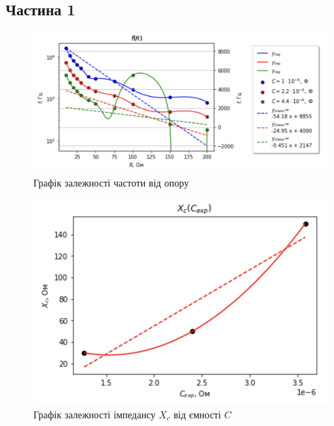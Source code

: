 \documentclass[a4paper,12pt]{article}
\begin{document}
\begin{justify}
    \subsection*{Частина 1}
    \begin{figure}[h!]
		\begin{center}
			\includegraphics[scale=0.8]{media/graph13}
		\end{center}
		\caption{Графік залежності частоти від опору}
		\label{Picture_1}
	\end{figure}
	\begin{figure}[h!]
		\begin{center}
			\includegraphics[scale=0.8]{media/graph14}
		\end{center}
		\caption{Графік залежності імпедансу $X_c$ від ємності $C$}
		\label{Picture_2}
	\end{figure}\newpage
    

\end{justify}
\end{document}
